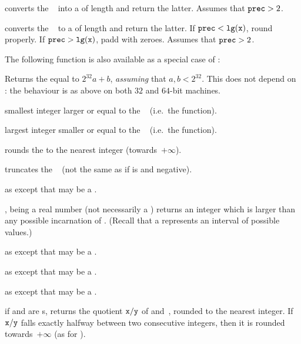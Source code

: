  converts the ~ into a
 of length  and return the latter. Assumes that
${\tt prec} > 2$.

 converts the ~ to a
 of length  and return the latter. If
${\tt prec} < {\tt lg(x)}$, round properly. If ${\tt prec} > {\tt lg(x)}$,
padd with zeroes. Assumes that ${\tt prec} > 2$.

\noindent The following function is also available as a special case of
:


Returns the  equal to $2^{32} a + b$, \emph{assuming} that
$a,b < 2^{32}$. This does not depend on : the behaviour is
as above on both $32$ and $64$-bit machines.


 smallest integer larger or equal
to the ~ (i.e.~the  function).

 largest integer smaller or equal to the
~ (i.e.~the  function).

 rounds the   to the nearest integer
(towards~$+\infty$).

 truncates the ~ (not the same as
 if  is and negative).

as  except that  may be a .

,  being a real number (not necessarily a
) returns an integer which is larger than any possible incarnation
of . (Recall that a  represents an interval of possible
values.)

as  except that  may be a .

as  except that  may be a .

as  except that  may be a .

 if  and  are s,
returns the quotient ${\tt x}/{\tt y}$ of  and~, rounded to
the nearest integer. If ${\tt x}/{\tt y}$ falls exactly halfway between
two consecutive integers, then it is rounded towards~$+\infty$ (as for
).

